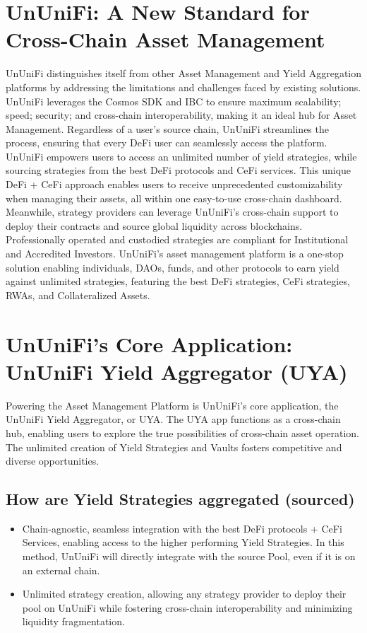 \documentclass[dvipdfmx]{jsarticle}
\begin{document}
\section{UnUniFi: A New Standard for Cross-Chain Asset Management}
UnUniFi distinguishes itself from other Asset Management and Yield Aggregation platforms by addressing the limitations and challenges faced by existing solutions. UnUniFi leverages the Cosmos SDK and IBC to ensure maximum scalability; speed; security; and cross-chain interoperability, making it an ideal hub for Asset Management. Regardless of a user’s source chain, UnUniFi streamlines the process, ensuring that every DeFi user can seamlessly access the platform. UnUniFi empowers users to access an unlimited number of yield strategies, while sourcing strategies from the best DeFi protocols and CeFi services. This unique DeFi + CeFi approach enables users to receive unprecedented customizability when managing their assets, all within one easy-to-use cross-chain dashboard.
Meanwhile, strategy providers can leverage UnUniFi’s cross-chain support to deploy their contracts and source global liquidity across blockchains. Professionally operated and custodied strategies are compliant for Institutional and Accredited Investors. UnUniFi’s asset management platform is a one-stop solution enabling individuals, DAOs, funds, and other protocols to earn yield against unlimited strategies, featuring the best DeFi strategies, CeFi strategies, RWAs, and Collateralized Assets.


\section{UnUniFi’s Core Application: UnUniFi Yield Aggregator (UYA)}

Powering the Asset Management Platform is UnUniFi’s core application, the UnUniFi Yield Aggregator, or UYA. The UYA app functions as a cross-chain hub, enabling users to explore the true possibilities of cross-chain asset operation. The unlimited creation of Yield Strategies and Vaults fosters competitive and diverse opportunities.

\subsection{How are Yield Strategies aggregated (sourced)}
\begin{itemize}
  \item Chain-agnostic, seamless integration with the best DeFi protocols + CeFi Services, enabling access to the higher performing Yield Strategies. In this method, UnUniFi will directly integrate with the source Pool, even if it is on an external chain.
  \item Unlimited strategy creation, allowing any strategy provider to deploy their pool on UnUniFi while fostering cross-chain interoperability and minimizing liquidity fragmentation.
\end{itemize}
\end{document}

